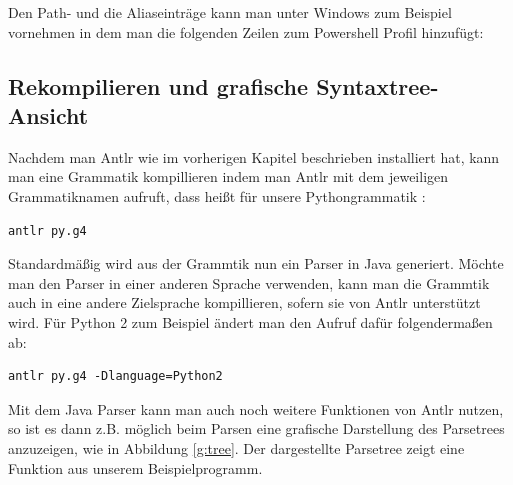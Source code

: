 Den Path- und die Aliaseinträge kann man unter Windows zum Beispiel vornehmen in dem man die folgenden Zeilen zum Powershell Profil hinzufügt:





\subsection{Rekompilieren und grafische Syntaxtree-Ansicht}

Nachdem man Antlr wie im vorherigen Kapitel beschrieben installiert hat, kann man eine Grammatik kompillieren indem man Antlr mit dem jeweiligen Grammatiknamen aufruft, dass heißt für unsere Pythongrammatik :
\begin{lstlisting}
antlr py.g4
\end{lstlisting}
Standardmäßig wird aus der Grammtik nun ein Parser in Java generiert. Möchte man den Parser in einer anderen Sprache verwenden, kann man die Grammtik auch in eine andere Zielsprache kompillieren, sofern sie von Antlr unterstützt wird. Für Python 2 zum Beispiel ändert man den Aufruf dafür folgendermaßen ab: \enlargethispage{1cm}
\begin{lstlisting}
antlr py.g4 -Dlanguage=Python2
\end{lstlisting}



Mit dem Java Parser kann man auch noch weitere Funktionen von Antlr nutzen, so ist es dann z.B. möglich beim Parsen eine grafische Darstellung des Parsetrees anzuzeigen, wie in Abbildung \ref{g:tree}. Der dargestellte Parsetree zeigt eine Funktion aus unserem Beispielprogramm.

